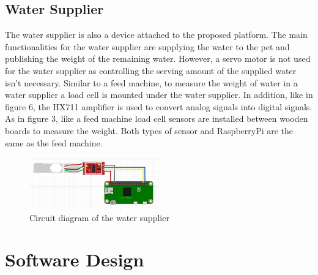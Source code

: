 \documentclass[conference]{IEEEtran}
\begin{document}
\subsection{Water Supplier}
The water supplier is also a device attached to the proposed platform. The main functionalities for the water supplier are supplying the water to the pet and publishing the weight of the remaining water. However, a servo motor is not used for the water supplier as controlling the serving amount of the supplied water isn’t necessary. Similar to a feed machine, to measure the weight of water in a water supplier a load cell is mounted under the water supplier. In addition, like in figure 6, the HX711 amplifier is used to convert analog signals into digital signals. As in figure 3, like a feed machine load cell sensors are installed between wooden boards to measure the weight. Both types of sensor and RaspberryPi are the same as the feed machine. 

\begin{figure}[htbp]
\centerline{\includegraphics[width=0.5\textwidth]{./images/water supplier circuit.jpg}}
\caption{Circuit diagram of the water supplier}
\label{fig}
\end{figure}

\section{Software Design}
\end{document}
